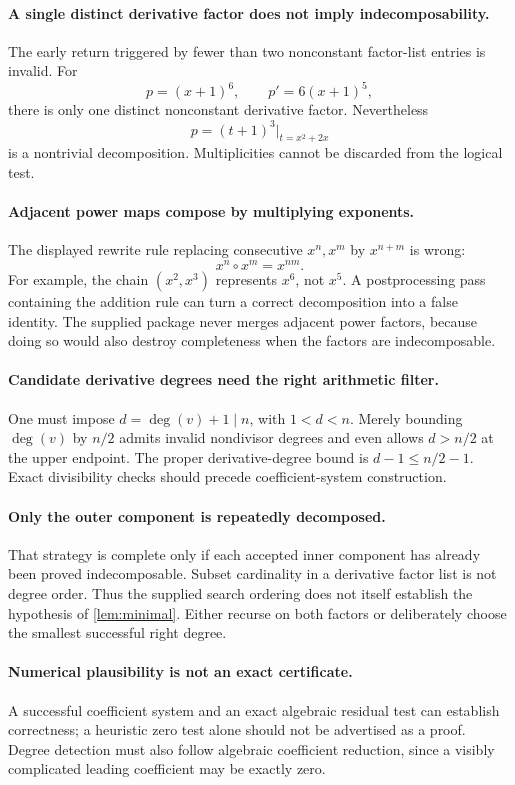 \documentclass[11pt,a4paper]{article}
\theoremstyle{definition}
\begin{document}
\paragraph{A single distinct derivative factor does not imply indecomposability.}
The early return triggered by fewer than two nonconstant factor-list entries is invalid. For
\[
 p=(x+1)^6,\qquad p'=6(x+1)^5,
\]
there is only one distinct nonconstant derivative factor. Nevertheless
\[
 p=(t+1)^3\big|_{t=x^2+2x}
\]
is a nontrivial decomposition. Multiplicities cannot be discarded from the logical test.

\paragraph{Adjacent power maps compose by multiplying exponents.}
The displayed rewrite rule replacing consecutive $x^n,x^m$ by $x^{n+m}$ is wrong:
\[
 x^n\circ x^m=x^{nm}.
\]
For example, the chain $(x^2,x^3)$ represents $x^6$, not $x^5$. A postprocessing pass containing the addition rule can turn a correct decomposition into a false identity. The supplied package never merges adjacent power factors, because doing so would also destroy completeness when the factors are indecomposable.

\paragraph{Candidate derivative degrees need the right arithmetic filter.}
One must impose $d=\deg(v)+1\mid n$, with $1<d<n$. Merely bounding $\deg(v)$ by $n/2$ admits invalid nondivisor degrees and even allows $d>n/2$ at the upper endpoint. The proper derivative-degree bound is $d-1\le n/2-1$. Exact divisibility checks should precede coefficient-system construction.

\paragraph{Only the outer component is repeatedly decomposed.}
That strategy is complete only if each accepted inner component has already been proved indecomposable. Subset cardinality in a derivative factor list is not degree order. Thus the supplied search ordering does not itself establish the hypothesis of \cref{lem:minimal}. Either recurse on both factors or deliberately choose the smallest successful right degree.

\paragraph{Numerical plausibility is not an exact certificate.}
A successful coefficient system and an exact algebraic residual test can establish correctness; a heuristic zero test alone should not be advertised as a proof. Degree detection must also follow algebraic coefficient reduction, since a visibly complicated leading coefficient may be exactly zero.
\end{document}
